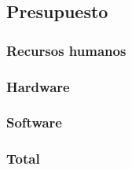 \subsection{Presupuesto}
\subsubsection{Recursos humanos}
\subsubsection{Hardware}
\subsubsection{Software}
\subsubsection{Total}

\pagebreak
